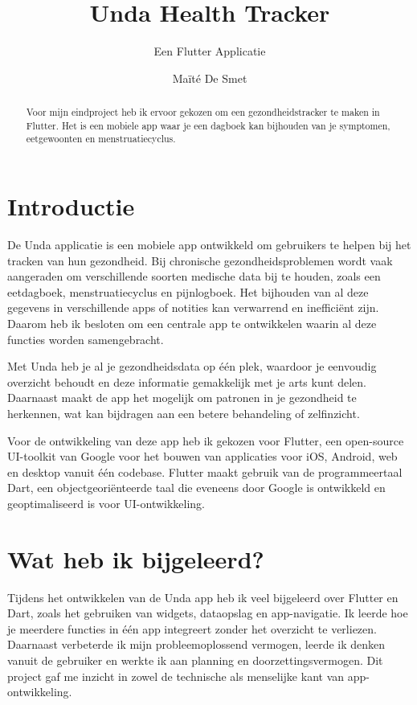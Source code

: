 \documentclass[a0,portrait]{hogent-poster}
\title{Unda Health Tracker}
\subtitle{Een Flutter Applicatie}
\author{Maïté De Smet}
\begin{document}
\maketitle

\begin{abstract}
Voor mijn eindproject heb ik ervoor gekozen om een gezondheidstracker te maken in Flutter. Het is een mobiele app waar je een dagboek kan bijhouden van je symptomen, eetgewoonten en menstruatiecyclus.
\end{abstract}

\begin{multicols}{2} %

\section{Introductie}
De Unda applicatie is een mobiele app ontwikkeld om gebruikers te helpen bij het tracken van hun gezondheid.
 Bij chronische gezondheidsproblemen wordt vaak aangeraden om verschillende soorten medische data bij te houden, 
 zoals een eetdagboek, menstruatiecyclus en pijnlogboek. 
 Het bijhouden van al deze gegevens in verschillende apps of notities kan verwarrend en inefficiënt zijn. 
 Daarom heb ik besloten om een centrale app te ontwikkelen waarin al deze functies worden samengebracht.

Met Unda heb je al je gezondheidsdata op één plek, waardoor je eenvoudig overzicht behoudt en deze informatie gemakkelijk 
met je arts kunt delen. Daarnaast maakt de app het mogelijk om patronen in je gezondheid te herkennen, wat kan bijdragen aan
 een betere behandeling of zelfinzicht.

Voor de ontwikkeling van deze app heb ik gekozen voor Flutter, een open-source UI-toolkit van Google voor het bouwen van 
applicaties voor iOS, Android, web en desktop vanuit één codebase. Flutter maakt gebruik van de programmeertaal Dart,
 een objectgeoriënteerde taal die eveneens door Google is ontwikkeld en geoptimaliseerd is voor UI-ontwikkeling.
\section{Wat heb ik bijgeleerd?}
Tijdens het ontwikkelen van de Unda app heb ik veel bijgeleerd over Flutter en Dart, zoals het gebruiken van widgets,
 dataopslag en app-navigatie. Ik leerde hoe je meerdere functies in één app integreert zonder het overzicht te verliezen.
Daarnaast verbeterde ik mijn probleemoplossend vermogen, leerde ik denken vanuit de gebruiker en werkte ik aan planning
 en doorzettingsvermogen. Dit project gaf me inzicht in zowel de technische als menselijke kant van app-ontwikkeling.


\end{multicols}
\end{document}
